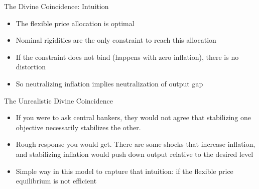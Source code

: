 \documentclass[11pt,aspectratio=169,xcolor={dvipsnames},hyperref={pdftex,pdfpagemode=UseNone,hidelinks,pdfdisplaydoctitle=true},usepdftitle=false]{beamer}
\begin{document}
\begin{frame}{The Divine Coincidence: Intuition}
\begin{itemize}
\item The flexible price allocation is optimal
\item Nominal rigidities are the only constraint to reach this allocation
\item If the constraint does not bind (happens with zero inflation), there is no distortion
\item So neutralizing inflation implies neutralization of output gap
\end{itemize}
\end{frame}


\begin{frame}{The Unrealistic Divine Coincidence}
\begin{itemize}
\item If you were to ask central bankers, they would not agree that stabilizing one objective necessarily stabilizes the other.
\item Rough response you would get. There are some shocks that increase inflation, and stabilizing inflation would push down output relative to the desired level
\item Simple way in this model to capture that intuition: if the flexible price equilibrium is not efficient
\end{itemize}
\end{frame}
\end{document}
